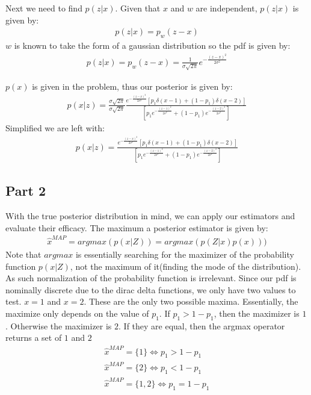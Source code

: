 \documentclass{article}
\begin{document}
Next we need to find $p(z|x)$. Given that $x$ and $w$ are independent, $p(z|x)$ is given by:
\begin{align*}
p(z|x) = p_w(z-x)
\end{align*}
$w$ is known to take the form of a gaussian distribution so the pdf is given by:
\begin{align*}
p(z|x) = p_w(z-x) = \frac{1}{\sigma \sqrt{2\pi}} e^{-\tfrac{(z-x)^2}{2\sigma^2}}
\end{align*}



$p(x)$ is given in the problem, thus our posterior is given by:
\begin{align*}
p(x|z) =  \frac{\sigma \sqrt{2\pi}}{\sigma \sqrt{2\pi}}  \frac{ e^{-\tfrac{(z-x)^2}{2\sigma^2}} [p_1 \delta(x-1) + (1-p_1) \delta(x-2)]}{[p_1 e^{-\tfrac{(z-1)^2}{2\sigma^2}} + (1-p_1) e^{-\tfrac{(z-2)^2}{2\sigma^2}}]}
\end{align*}
Simplified we are left with:
\begin{align*}
\boxed { p(x|z) =  \frac{ e^{-\tfrac{(z-x)^2}{2\sigma^2}} [p_1 \delta(x-1) + (1-p_1) \delta(x-2)]}{[p_1 e^{-\tfrac{(z-1)^2}{2\sigma^2}} + (1-p_1) e^{-\tfrac{(z-2)^2}{2\sigma^2}}]} }
\end{align*}

\subsection*{Part 2}
With the true posterior distribution in mind, we can apply our estimators and evaluate their efficacy. The maximum a posterior estimator is given by:
\begin{align*}
\hat{x}^{MAP} = argmax(p(x|Z)) = argmax(p(Z|x)p(x)))
\end{align*}
Note that $argmax$ is essentially searching for the maximizer of the probability function $p(x|Z)$, not the maximum of it(finding the mode of the distribution). As such normalization of the probability function is irrelevant. Since our pdf is nominally discrete due to the dirac delta functions, we only have two values to test. $x=1$ and $x=2$. These are the only two possible maxima. Essentially, the maximize only depends on the value of $p_1$. If $p_1>1-p_1$, then the maximizer is $1$. Otherwise the maximizer is $2$. If they are equal, then the argmax operator returns a set of $1$ and $2$
\begin{align*}
\boxed{ \hat{x}^{MAP} = \{1\} \iff p_1 > 1-p_1 } \\
\boxed{ \hat{x}^{MAP} = \{2\} \iff p_1 < 1-p_1 }\\
\boxed{ \hat{x}^{MAP} = \{1,2\} \iff p_1 = 1-p_1 }
\end{align*}
\clearpage
\end{document}
